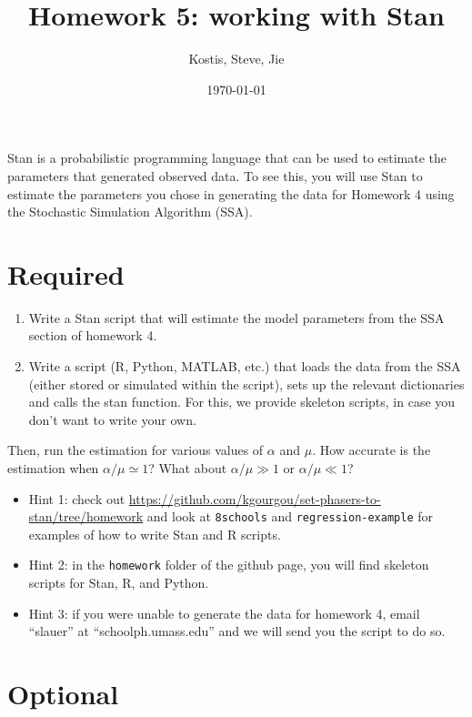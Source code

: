 \documentclass{article}\usepackage[]{graphicx}\usepackage[]{color}
\title{Homework 5: working with Stan}
\author{Kostis, Steve, Jie}
\date{\today}
\begin{document}
\maketitle

Stan is a probabilistic programming language that can be used to estimate the parameters that generated observed data. To see this, you will use Stan to estimate the parameters you chose in generating the data for Homework 4 using the Stochastic Simulation Algorithm (SSA).

\section{Required}

\begin{enumerate}
    \item Write a Stan script that will estimate the model parameters from the SSA section of homework 4.
    \item Write a script (R, Python, MATLAB, etc.) that loads the data from the
      SSA (either stored or simulated within the script), sets up the relevant
      dictionaries and calls the stan function. For this, we provide skeleton
      scripts, in case you don't want to write your own. 
\end{enumerate}

Then, run the estimation for various values of $\alpha$ and $\mu$. How accurate
is the estimation when $\alpha/\mu\simeq 1$?  What about $\alpha/\mu\gg 1$ or
$\alpha/\mu\ll 1$?

\begin{itemize}
\item Hint 1: check out \url{https://github.com/kgourgou/set-phasers-to-stan/tree/homework} and look at {\tt 8schools} and {\tt regression-example} for examples of how to write Stan and R scripts.

\item Hint 2: in the {\tt homework} folder of the github page, you will find skeleton scripts for Stan, R, and Python.

\item Hint 3: if you were unable to generate the data for homework 4, email ``slauer'' at ``schoolph.umass.edu'' and we will send you the script to do so.
\end{itemize}

\section{Optional}
\end{document}
